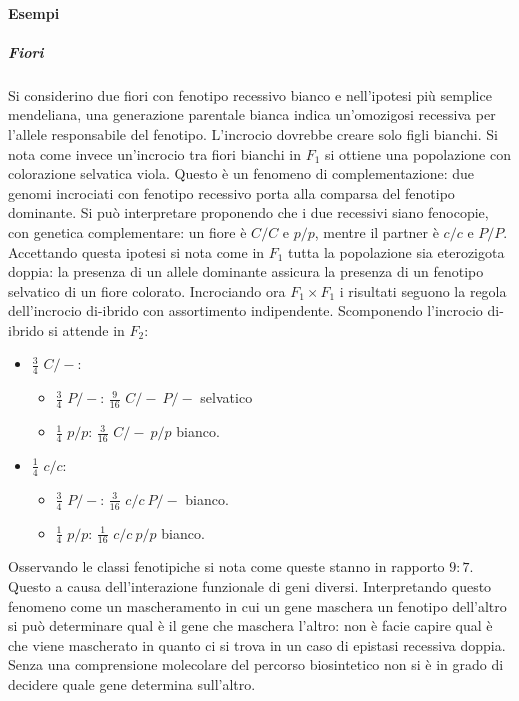 \paragraph{Esempi}
\subparagraph{Fiori}
Si considerino due fiori con fenotipo recessivo bianco e nell'ipotesi pi\`u semplice mendeliana, una generazione parentale bianca indica un'omozigosi recessiva per l'allele responsabile
del fenotipo. L'incrocio dovrebbe creare solo figli bianchi. Si nota come invece un'incrocio tra fiori bianchi in $F_1$ si ottiene una popolazione con colorazione selvatica viola. 
Questo \`e un fenomeno di complementazione: due genomi incrociati con fenotipo recessivo porta alla comparsa del fenotipo dominante. Si pu\`o interpretare proponendo che i due recessivi
siano fenocopie, con genetica complementare: un fiore \`e $C/C$ e $p/p$, mentre il partner \`e $c/c$ e $P/P$. Accettando questa ipotesi si nota come in $F_1$ tutta la popolazione
sia eterozigota doppia: la presenza di un allele dominante assicura la presenza di un fenotipo selvatico di un fiore colorato. Incrociando ora $F_1\times F_1$ i risultati seguono la
regola dell'incrocio di-ibrido con assortimento indipendente. Scomponendo l'incrocio di-ibrido si attende in $F_2$:
\begin{itemize}
	\item $\frac{3}{4}$ $C/-$:
		\begin{itemize}
			\item $\frac{3}{4}$ $P/-$: $\frac{9}{16}$ $C/-\ P/-$ selvatico
			\item $\frac{1}{4}$ $p/p$: $\frac{3}{16}$ $C/-\ p/p$ bianco.
		\end{itemize}
	\item $\frac{1}{4}$ $c/c$:
		\begin{itemize}
			\item $\frac{3}{4}$ $P/-$: $\frac{3}{16}$ $c/c\ P/-$ bianco.
			\item $\frac{1}{4}$ $p/p$: $\frac{1}{16}$ $c/c\ p/p$ bianco.
		\end{itemize}
\end{itemize}
Osservando le classi fenotipiche si nota come queste stanno in rapporto $9:7$. Questo a causa dell'interazione funzionale di geni diversi. Interpretando questo fenomeno come un 
mascheramento in cui un gene maschera un fenotipo dell'altro si pu\`o determinare qual \`e il gene che maschera l'altro: non \`e facie capire qual \`e che viene mascherato in quanto 
ci si trova in un caso di epistasi recessiva doppia. Senza una comprensione molecolare del percorso biosintetico non si \`e in grado di decidere quale gene determina sull'altro. \\
